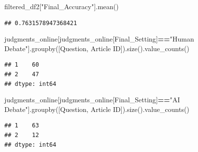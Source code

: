 \documentclass[
]{article}
\newenvironment{Shaded}{\begin{snugshade}}{\end{snugshade}}
\newcommand{\NormalTok}[1]{#1}
\newcommand{\OperatorTok}[1]{\textcolor[rgb]{0.81,0.36,0.00}{\textbf{#1}}}
\newcommand{\StringTok}[1]{\textcolor[rgb]{0.31,0.60,0.02}{#1}}
\begin{document}
\begin{Shaded}
\begin{Highlighting}[]
\NormalTok{filtered\_df2[}\StringTok{"Final\_Accuracy"}\NormalTok{].mean()}
\end{Highlighting}
\end{Shaded}

\begin{verbatim}
## 0.7631578947368421
\end{verbatim}

\begin{Shaded}
\begin{Highlighting}[]
\NormalTok{judgments\_online[judgments\_online[}\StringTok{\textquotesingle{}Final\_Setting\textquotesingle{}}\NormalTok{]}\OperatorTok{==}\StringTok{"Human Debate"}\NormalTok{].groupby([}\StringTok{\textquotesingle{}Question\textquotesingle{}}\NormalTok{, }\StringTok{\textquotesingle{}Article ID\textquotesingle{}}\NormalTok{]).size().value\_counts()}
\end{Highlighting}
\end{Shaded}

\begin{verbatim}
## 1    60
## 2    47
## dtype: int64
\end{verbatim}

\begin{Shaded}
\begin{Highlighting}[]
\NormalTok{judgments\_online[judgments\_online[}\StringTok{\textquotesingle{}Final\_Setting\textquotesingle{}}\NormalTok{]}\OperatorTok{==}\StringTok{"AI Debate"}\NormalTok{].groupby([}\StringTok{\textquotesingle{}Question\textquotesingle{}}\NormalTok{, }\StringTok{\textquotesingle{}Article ID\textquotesingle{}}\NormalTok{]).size().value\_counts()}
\end{Highlighting}
\end{Shaded}

\begin{verbatim}
## 1    63
## 2    12
## dtype: int64
\end{verbatim}
\end{document}
